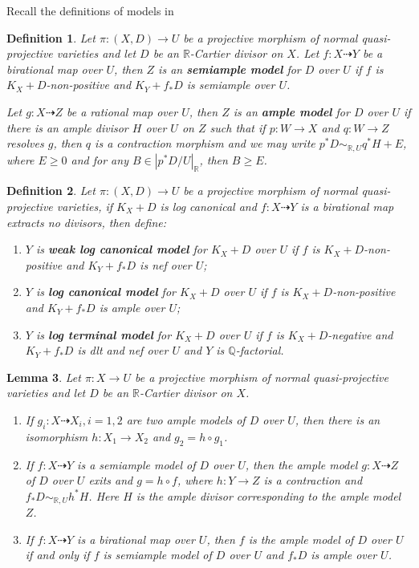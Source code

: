 \documentclass{article}
\newtheorem{defn}{Definition}[subsection]
\newtheorem{lem}[defn]{Lemma}
\begin{document}
Recall the definitions of models in \cite{birkarExistenceMinimalModels2009}
\begin{defn}
  \cite[Definition 3.6.5]{birkarExistenceMinimalModels2009} Let $ \pi:(X,D)\to U $ be a projective morphism of normal quasi-projective varieties and let $D$ be an $\mathbb{R}$-Cartier divisor on $X$. Let $ f:X\dashrightarrow Y $ be a birational map over $ U $, then $ Z $ is an \textbf{semiample model } for $ D $ over $ U $ if $ f $ is $ K_X+D $-non-positive and $ K_Y+f_*D $ is semiample over $ U $.

  Let $ g:X\dashrightarrow Z $ be a rational map over $ U $, then $ Z $ is an \textbf{ample model } for $ D $ over $ U $ if there is  an ample divisor $H$  over $U$  on $Z$  such that if $p:W \to X $ and $q:W \to Z $ resolves $g$, then $q$ is a contraction morphism and we may write $p^*D \sim_{\mathbb{R},U} q^*H+E$, where $E\geqslant 0$ and for any $B \in |p^*D/U|_{\mathbb{R}}$, then $B\geqslant E$.
\end{defn}
\begin{defn}\label{models}
  \cite[Definition 3.6.7]{birkarExistenceMinimalModels2009} Let $ \pi:(X,D)\to U $ be a projective morphism of normal quasi-projective varieties, if $ K_X+D $ is log canonical and $ f:X\dashrightarrow Y $ is a birational map extracts no divisors, then define:
  \begin{enumerate}
    \item $ Y $ is \textbf{weak log canonical model} for $ K_X+D $ over $ U $ if $ f $ is $ K_X+D $-non-positive and $ K_Y+f_*D $ is nef over $ U $;
    \item $ Y $ is \textbf{ log canonical model} for $ K_X+D $ over $ U $ if $ f $ is $ K_X+D $-non-positive and $ K_Y+f_*D $ is ample over $ U $;
    \item $ Y $ is \textbf{ log terminal model} for $ K_X+D $ over $ U $ if $ f $ is $ K_X+D $-negative and $ K_Y+f_*D $ is dlt and nef over $ U $ and $ Y $ is $ \mathbb{Q} $-factorial.
  \end{enumerate}
\end{defn}
\begin{lem}\cite[Lemma 3.6.6]{birkarExistenceMinimalModels2009}
  Let $\pi:X \to U$ be a projective morphism of normal quasi-projective varieties and let $D$ be an $\mathbb{R}$-Cartier divisor on $X$.
  \begin{enumerate}
    \item If $g_{i}:X \dashrightarrow X_{i},i=1,2$ are two ample models of $D$ over $U$, then there is an isomorphism $h:X_{1}\to X_{2}$ and $g_{2}=h \circ g_{1}$.
    \item If $f:X \dashrightarrow Y$ is a semiample model of $D$ over $U$, then the ample model $g:X \dashrightarrow  Z$ of $D$ over $U$   exits and $g=h \circ f$, where $h:Y \to Z$ is a contraction and $f_*D \sim_{\mathbb{R},U}h^*H$. Here $H$ is the ample divisor corresponding to the ample model $Z$. 
  \item  If $f:X \dashrightarrow Y$ is a birational map over $U$, then $f$ is the ample model of $D$ over $U$ if and only if $f$ is semiample model of $D$ over $U$ and $f_*D$ is ample over $U$.     
  \end{enumerate}
\end{lem}
\end{document}
